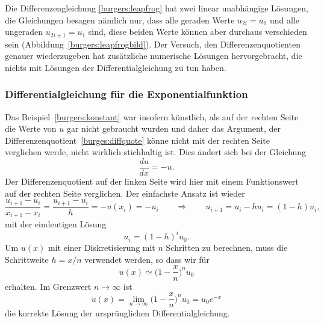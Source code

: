 Die Differenzengleichung
\eqref{burgers:leapfrog}
hat zwei linear unabhängige Lösungen, die Gleichungen besagen
nämlich nur, dass alle geraden Werte $u_{2i}=u_0$ und alle ungeraden
$u_{2i+1}=u_1$ sind, diese beiden Werte können aber durchaus verschieden
sein (Abbildung~\ref{burgers:leapfrogbild}).
Der Versuch, den Differenzenquotienten genauer wiederzugeben hat 
zusätzliche numerische Lösungen hervorgebracht, die nichts mit Lösungen
der Differentialgleichung zu tun haben.

\subsubsection{Differentialgleichung für die Exponentialfunktion}
Das Beispiel~\eqref{burgers:konstant} war insofern künstlich, als auf der
rechten Seite die Werte von $u$ gar nicht gebraucht wurden und daher das
Argument, der Differenzenquotient~\eqref{burges:diffquote} könne nicht
mit der rechten Seite verglichen werde, nicht wirklich stichhaltig ist.
Dies ändert sich bei der Gleichung
\begin{equation}
\frac{du}{dx} = -u.
\label{burgers:expo}
\end{equation}
Der Differenzenquotient auf der linken Seite wird hier mit einem
Funktionswert auf der rechten Seite verglichen. 
Der einfachste Ansatz ist wieder
\[
\frac{u_{i+1}-u_i}{x_{i+1}-x_{i}}
=
\frac{u_{i+1}-u_i}{h} = -u(x_i) = -u_i
\qquad\Rightarrow\qquad
u_{i+1} = u_i-hu_i=(1-h)u_i,
\]
mit der eindeutigen Lösung
\[
u_i = (1-h)^iu_0.
\]
Um $u(x)$ mit einer Diskretisierung mit $n$ Schritten zu berechnen,
muss die Schrittweite $h=x/n$ verwendet werden, so dass wir für
\[
u(x) \simeq \biggl(1-\frac{x}{n}\biggr)^n u_0
\]
erhalten.
Im Grenzwert $n\to\infty$ ist
\[
u(x) = \lim_{n\to\infty} \biggl(1-\frac{x}{n}\biggr)^n u_0 = u_0e^{-x}
\]
die korrekte Lösung der ursprünglichen Differentialgleichung.

